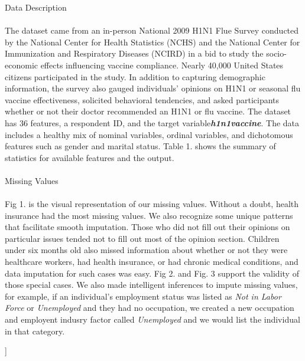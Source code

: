 \documentclass{IEEEtran}
\begin{document}
\begin{@twocolumnfalse}
{\huge Data Description}\\\\
The dataset came from an in-person National 2009 H1N1 Flue Survey conducted by the National Center for Health Statistics (NCHS) and the National Center for Immunization and Respiratory Diseases (NCIRD) in a bid to study the socio-economic effects influencing vaccine compliance. Nearly 40,000 United States citizens participated in the study.  In addition to capturing demographic information, the survey also gauged individuals' opinions on H1N1 or seasonal flu vaccine effectiveness, solicited behavioral tendencies, and asked participants whether or not their doctor recommended an H1N1 or flu vaccine.  The dataset has 36 features, a respondent ID, and the target variable\textemdash \textbf{\emph{h1n1\textunderscore vaccine}}. The data includes a healthy mix of nominal variables, ordinal variables, and dichotomous features such as gender and marital status.  Table 1. shows the summary of statistics for available features and the output.\\\\
{\huge Missing Values}\\\\ 
Fig 1. is the visual representation of our missing values. Without a doubt, health insurance had the most missing values. We also recognize some unique patterns that facilitate smooth imputation. Those who did not fill out their opinions on particular issues tended not to fill out most of the opinion section. Children under six months old also missed information about whether or not they were healthcare workers, had health insurance, or had chronic medical conditions, and data imputation for such cases was easy. Fig 2. and Fig. 3 support the validity of those special cases. We also made intelligent inferences to impute missing values, for example, if an individual's employment status was listed as \emph{Not in Labor Force} or \emph{Unemployed} and they had no occupation, we created a new occupation and employent indusry factor called \emph{Unemployed} and we would list the individual in that category.
\end{@twocolumnfalse}
]
\clearpage
\end{document}
